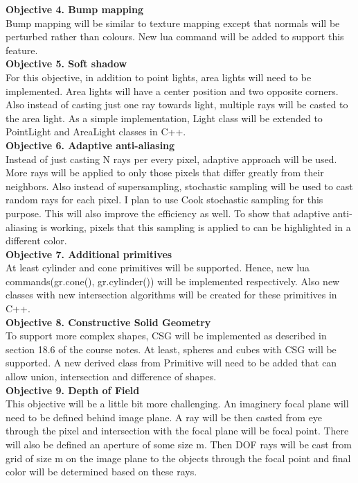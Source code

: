 \documentclass {article}
\begin{document}
\begin{description}
	 {\bf Objective 4. Bump mapping}\\
	 Bump mapping will be similar to texture mapping except that normals will be perturbed rather than colours. New lua command will be added
	 to support this feature.\\

	 {\bf Objective 5. Soft shadow}\\
	 For this objective, in addition to point lights, area lights will need to be implemented. Area lights will have a center
	 position and two opposite corners. Also instead of casting just one ray towards light, multiple rays will be casted to
	 the area light. As a simple implementation, Light class will be extended to PointLight and AreaLight classes in C++.\\

	 {\bf Objective 6. Adaptive anti-aliasing}\\
	 Instead of just casting N rays per every pixel, adaptive approach will be used. More rays will be applied to only those pixels
	 that differ greatly from their neighbors. Also instead of supersampling, stochastic sampling will be used to cast random rays
	 for each pixel. I plan to use Cook stochastic sampling for this purpose. This will also improve the efficiency as well. To show that
	 adaptive anti-aliasing is working, pixels that this sampling is applied to can be highlighted in a different color.\\

	 {\bf Objective 7. Additional primitives}\\
	 At least cylinder and cone primitives will be supported. Hence, new lua commands(gr.cone(), gr.cylinder()) will be implemented
	 respectively. Also new classes with new intersection algorithms will be created for these primitives in C++.\\

	 {\bf Objective 8. Constructive Solid Geometry}\\
	 To support more complex shapes, CSG will be implemented as described in section 18.6 of the course notes. At least, spheres and
	 cubes with CSG will be supported. A new derived class from Primitive will need to be added that can allow union, intersection
	 and difference of shapes.\\

	 {\bf Objective 9. Depth of Field}\\
	 This objective will be a little bit more challenging. An imaginery focal plane will need to be defined behind image plane.
	 A ray will be then casted from eye through the pixel and intersection with the focal plane will be focal point. There will
	 also be defined an aperture of some size m. Then DOF rays will be cast from grid of size m on the image plane to the objects through
	 the focal point and final color will be determined based on these rays.\\


\end{description}
\end{document}
